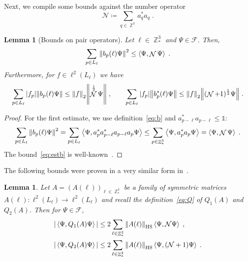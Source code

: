 \documentclass[12pt,a4paper]{article}
\numberwithin{equation}{section}
\newcommand{\cF}{\mathcal{F}}
\newcommand{\cN}{\mathcal{N}}
\newcommand{\1}{\mathbb{I}}
\newcommand{\HS}{\mathrm{HS}}
\DeclareMathOperator{\Z}{\mathbb{Z}}
\DeclareMathOperator{\NN}{\mathcal{N}}
\newcommand{\half}{\frac{1}{2}}
\newcommand{\eva}[1]{\left\langle #1 \right\rangle}
\theoremstyle{plain}
\newtheorem{lemma}[theorem]{Lemma}
\theoremstyle{definition}
\theoremstyle{remark}
\theoremstyle{plain}
\theoremstyle{definition}
\theoremstyle{remark}
\begin{document}
Next, we compile some bounds against the number operator
\begin{equation} \label{eq:cN}
	\cN \coloneq \sum_{q \in \Z^3} a_q^* a_q \;.
\end{equation}

\begin{lemma}[Bounds on pair operators]\label{lem:pairest}
Let $\ell \in \Z^3_*$ and $ \Psi \in \cF $. Then,
\begin{equation}\label{eq:estopb}
	\sum\limits_{p \in L_\ell}\norm{b_p(\ell)\Psi}^2
	\leq \eva{\Psi, \NN\Psi} \;.
\end{equation}
Furthermore, for $f \in \ell^2(L_\ell)$ we have
\begin{equation} \label{eq:estb}
	\sum\limits_{p\in L_\ell} |f_p| \norm{b_p(\ell) \Psi}
	\leq \norm{f}_2 \norm{\NN^\half\Psi} \;, \qquad
	\sum\limits_{p\in L_\ell} |f_p| \norm{b^*_p(\ell) \Psi}
	\leq \norm{f}_2 \norm{(\NN+1)^\half\Psi} \;.
\end{equation}
\end{lemma}
\begin{proof}
For the first estimate, we use definition~\eqref{eq:b} and $a^*_{p-\ell}a_{p-\ell} \leq \mathds{1}$:
\begin{equation}
	\sum\limits_{p \in L_\ell}\norm{b_p(\ell)\Psi}^2
	= \sum\limits_{p \in L_\ell} \eva{\Psi,a^*_{p} a^*_{p-\ell}a_{p-\ell} a_{p}\Psi}
	\leq \sum\limits_{p \in \Z^3_*} \eva{\Psi, a^*_{p} a_{p}\Psi}
	= \eva{\Psi, \NN \Psi} \;.
\end{equation}
The bound~\eqref{eq:estb} is well-known~\cite[Prop.~4.2]{CHN21}.
\end{proof}

The following bounds were proven in a very similar form in~\cite[Prop.~4.7]{CHN21}.

\begin{lemma}\label{lem:estQ2}
Let $A = (A(\ell))_{\ell \in \Z^3_*}$ be a family of symmetric matrices $ A(\ell) : \ell^2(L_\ell) \to \ell^2(L_\ell) $ and recall the definition~\eqref{eq:Q} of $ Q_1(A) $ and $ Q_2(A) $. Then for $ \Psi \in \cF $,
\begin{equation} \label{eq:Qest}
\begin{aligned}
	|\eva{\Psi,Q_1(A)\Psi}|
	&\leq 2\sum\limits_{\ell\in \Z^3_*}\norm{A(\ell)}_{\HS}\eva{\Psi,\mathcal{N} \Psi} \;, \\
	|\eva{\Psi,Q_2(A)\Psi}|
	&\leq 2\sum\limits_{\ell\in \Z^3_*}\norm{A(\ell)}_{\HS}\eva{\Psi,(\mathcal{N}+1) \Psi} \;.
\end{aligned}
\end{equation}
\end{lemma}
\end{document}
